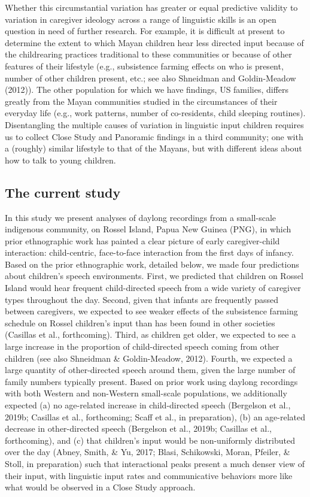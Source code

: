 \documentclass[,man,floatsintext]{apa6}
\begin{document}
Whether this circumstantial variation has greater or equal predictive
validity to variation in caregiver ideology across a range of linguistic
skills is an open question in need of further research. For example, it
is difficult at present to determine the extent to which Mayan children
hear less directed input because of the childrearing practices
traditional to these communities or because of other features of their
lifestyle (e.g., subsistence farming effects on who is present, number
of other children present, etc.; see also Shneidman and Goldin-Meadow
(2012)). The other population for which we have findings, US families,
differs greatly from the Mayan communities studied in the circumstances
of their everyday life (e.g., work patterns, number of co-residents,
child sleeping routines). Disentangling the multiple causes of variation
in linguistic input children requires us to collect Close Study and
Panoramic findings in a third community; one with a (roughly) similar
lifestyle to that of the Mayans, but with different ideas about how to
talk to young children.

\subsection{The current study}\label{the-current-study}

In this study we present analyses of daylong recordings from a
small-scale indigenous community, on Rossel Island, Papua New Guinea
(PNG), in which prior ethnographic work has painted a clear picture of
early caregiver-child interaction: child-centric, face-to-face
interaction from the first days of infancy. Based on the prior
ethnographic work, detailed below, we made four predictions about
children's speech environments. First, we predicted that children on
Rossel Island would hear frequent child-directed speech from a wide
variety of caregiver types throughout the day. Second, given that
infants are frequently passed between caregivers, we expected to see
weaker effects of the subsistence farming schedule on Rossel children's
input than has been found in other societies (Casillas et al.,
forthcoming). Third, as children get older, we expected to see a large
increase in the proportion of child-directed speech coming from other
children (see also Shneidman \& Goldin-Meadow, 2012). Fourth, we
expected a large quantity of other-directed speech around them, given
the large number of family numbers typically present. Based on prior
work using daylong recordings with both Western and non-Western
small-scale populations, we additionally expected (a) no age-related
increase in child-directed speech (Bergelson et al., 2019b; Casillas et
al., forthcoming; Scaff et al., in preparation), (b) an age-related
decrease in other-directed speech (Bergelson et al., 2019b; Casillas et
al., forthcoming), and (c) that children's input would be non-uniformly
distributed over the day (Abney, Smith, \& Yu, 2017; Blasi, Schikowski,
Moran, Pfeiler, \& Stoll, in preparation) such that interactional peaks
present a much denser view of their input, with linguistic input rates
and communicative behaviors more like what would be observed in a Close
Study approach.
\end{document}
